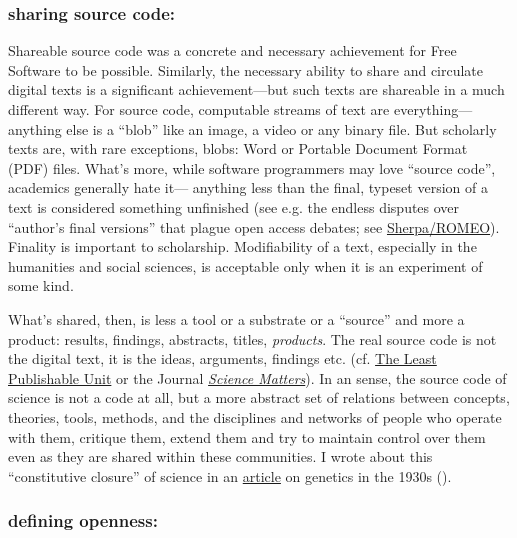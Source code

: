 \documentclass[11pt]{article}
\begin{document}
\subsubsection*{\textbf{sharing source code}:}
\label{sec:orgb8b3cf7}
Shareable source code was a concrete and necessary achievement for Free Software to be possible.  Similarly, the necessary ability to share and circulate digital texts is a significant achievement---but such texts are shareable in a much different way.  For source code, computable streams of text are everything---anything else is a ``blob'' like an image, a video or any binary file. But scholarly texts are, with rare exceptions, blobs: Word or Portable Document Format (PDF) files.   What's more, while software programmers may love ``source code'', academics generally hate it--- anything less than the final, typeset version of a text is considered something unfinished (see e.g. the endless disputes over ``author's final versions'' that plague open access debates; see \href{http://www.sherpa.ac.uk/romeo/index.php}{Sherpa/ROMEO}).  Finality is important to scholarship.  Modifiability of a text, especially in the humanities and social sciences, is acceptable only when it is an experiment of some kind.

What's shared, then, is less a tool or a substrate or a ``source'' and more a product: results, findings, abstracts, titles, \emph{products}.   The real source code is not the digital text, it is the ideas, arguments, findings etc.  (cf. \href{https://en.wikipedia.org/wiki/Least\_publishable\_unit}{The Least Publishable Unit} or the Journal \emph{\href{https://www.sciencematters.io/why-matters}{Science Matters}}).  In an sense, the source code of science is not a code at all, but a more abstract set of relations between concepts, theories, tools, methods, and the disciplines and networks of people who operate with them, critique them, extend them and try to maintain control over them even as they are shared within these communities.  I wrote about this ``constitutive closure'' of science in an \href{https://kelty.org/or/papers/Kelty-biosoc20128a.pdf}{article} on genetics in the 1930s (\cite{kelty2012not}).

\subsubsection*{\textbf{defining openness}:}
\label{sec:org5c968c0}
\end{document}
